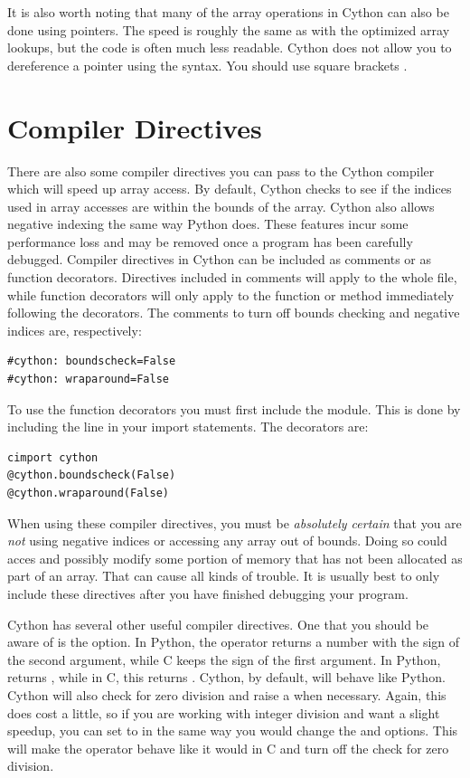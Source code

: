 It is also worth noting that many of the array operations in Cython can also be done using pointers.
The speed is roughly the same as with the optimized array lookups, but the code is often much less readable.
Cython does not allow you to dereference a pointer using the \li{*} syntax.
You should use square brackets \li{[ ]}.

\section*{Compiler Directives}
There are also some compiler directives you can pass to the Cython compiler which will speed up array access.
By default, Cython checks to see if the indices used in array accesses are within the bounds of the array.
Cython also allows negative indexing the same way Python does.
These features incur some performance loss and may be removed once a program has been carefully debugged.
Compiler directives in Cython can be included as comments or as function decorators.
Directives included in comments will apply to the whole file, while function decorators will only apply to the function or method immediately following the decorators.
The comments to turn off bounds checking and negative indices are, respectively:
\begin{lstlisting}
#cython: boundscheck=False
#cython: wraparound=False
\end{lstlisting}
To use the function decorators you must first include the  module.
This is done by including the line  in your import statements.
The decorators are:
\begin{lstlisting}
cimport cython
@cython.boundscheck(False)
@cython.wraparound(False)
\end{lstlisting}
When using these compiler directives, you must be \emph{absolutely certain} that you are \emph{not} using negative indices or accessing any array out of bounds.
Doing so could acces and possibly modify some portion of memory that has not been allocated as part of an array.
That can cause all kinds of trouble.
It is usually best to only include these directives after you have finished debugging your program.

Cython has several other useful compiler directives.
One that you should be aware of is the  option.
In Python, the \li{\%} operator returns a number with the sign of the second argument, while C keeps the sign of the first argument.
In Python,  returns , while in C, this returns .
Cython, by default, will behave like Python.
Cython will also check for zero division and raise a  when necessary.
Again, this does cost a little, so if you are working with integer division and want a slight speedup, you can set  to  in the same way you would change the  and  options.
This will make the \li{\%} operator behave like it would in C and turn off the check for zero division.

